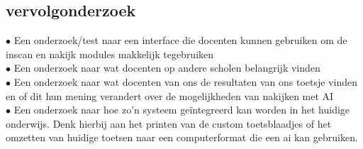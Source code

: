 \documentclass[12pt]{article}
\begin{document}
\begin{multicols}{2}
\subsection{vervolgonderzoek}
$\bullet$ Een onderzoek/test naar een interface die docenten kunnen gebruiken om de inscan en nakijk modules makkelijk tegebruiken\\
$\bullet$ Een onderzoek naar wat docenten op andere scholen belangrijk vinden\\
$\bullet$ Een onderzoek naar wat docenten van ons de resultaten van ons toetsje vinden en of dit hun mening verandert over de mogelijkheden van nakijken met AI\\
$\bullet$ Een onderzoek naar hoe zo'n systeem geïntegreerd kan worden in het huidige onderwijs. Denk hierbij aan het printen van de custom toetsblaadjes of het omzetten van huidige toetsen naar een computerformat  die een ai kan gebruiken.\\

\end{multicols}

\pagebreak
\end{document}
